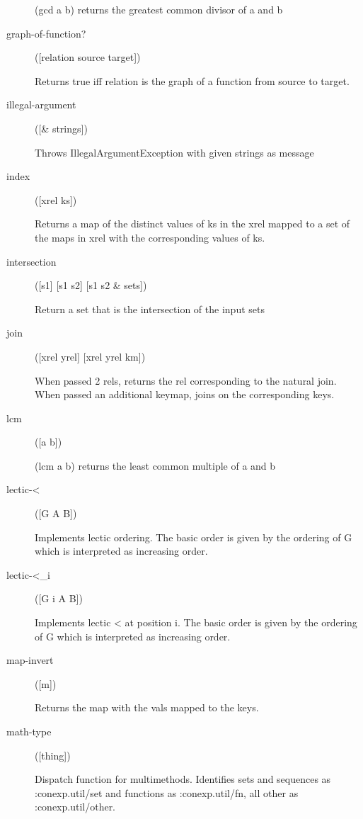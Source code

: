 \begin{description}
(gcd a b) returns the greatest common divisor of a and b

  \item[graph-of-function?]
([relation source target])

Returns true iff relation is the graph of a function from source to target.

  \item[illegal-argument]
([\& strings])

Throws IllegalArgumentException with given strings as message

  \item[index]
([xrel ks])

Returns a map of the distinct values of ks in the xrel mapped to a
  set of the maps in xrel with the corresponding values of ks.

  \item[intersection]
([s1] [s1 s2] [s1 s2 \& sets])

Return a set that is the intersection of the input sets

  \item[join]
([xrel yrel] [xrel yrel km])

When passed 2 rels, returns the rel corresponding to the natural
  join. When passed an additional keymap, joins on the corresponding
  keys.

  \item[lcm]
([a b])

(lcm a b) returns the least common multiple of a and b

  \item[lectic-<]
([G A B])

Implements lectic ordering. The basic order is given by the ordering of G
  which is interpreted as increasing order.

  \item[lectic-<\_i]
([G i A B])

Implements lectic < at position i. The basic order is given by the ordering
  of G which is interpreted as increasing order.

  \item[map-invert]
([m])

Returns the map with the vals mapped to the keys.

  \item[math-type]
([thing])

Dispatch function for multimethods. Identifies sets and sequences
  as :conexp.util/set and functions as :conexp.util/fn, all other as
  :conexp.util/other.


\end{description}
